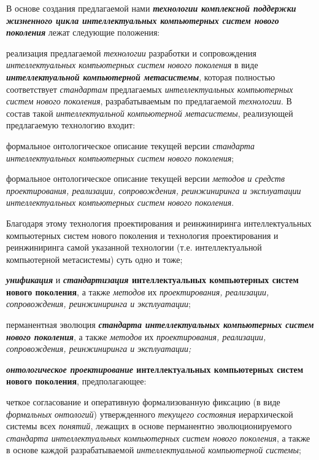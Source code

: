 В основе создания предлагаемой нами \textbf{\textit{технологии комплексной поддержки жизненного цикла интеллектуальных компьютерных систем нового поколения}} лежат следующие положения:
\begin{textitemize}
	\item реализация предлагаемой \textit{технологии} разработки и сопровождения \textit{интеллектуальных компьютерных систем нового поколения} в виде \textbf{\textit{интеллектуальной компьютерной метасистемы}}, которая полностью соответствует \textit{стандартам} предлагаемых \textit{интеллектуальных компьютерных систем нового поколения}, разрабатываемым по предлагаемой \textit{технологии}. В состав такой \textit{интеллектуальной компьютерной метасистемы}, реализующей предлагаемую технологию входит:
	
	\begin{textitemize}
		\item  формальное онтологическое описание текущей версии \textit{стандарта интеллектуальных компьютерных систем нового поколения};
		\item  формальное онтологическое описание текущей версии \textit{методов и средств проектирования, реализации, сопровождения, реинжиниринга и эксплуатации интеллектуальных компьютерных систем нового поколения}.
	\end{textitemize}
	
	Благодаря этому технология проектирования и реинжиниринга интеллектуальных компьютерных систем нового поколения и технология проектирования и реинжиниринга самой указанной технологии (т.е. интеллектуальной компьютерной метасистемы) суть одно и тоже;
	
	\item \textbf{\textit{унификация}} и \textbf{\textit{стандартизация} интеллектуальных компьютерных систем нового поколения}, а также \textit{методов} их \textit{проектирования, реализации, сопровождения, реинжиниринга и эксплуатации};
	\item перманентная эволюция \textbf{\textit{стандарта интеллектуальных компьютерных систем нового поколения}}, а также \textit{методов} их \textit{проектирования, реализации, сопровождения, реинжиниринга и эксплуатации;}
	\item \textbf{\textit{онтологическое проектирование} интеллектуальных компьютерных систем нового поколения}, предполагающее:
	
	\begin{textitemize}
		\item  четкое согласование и оперативную формализованную фиксацию (в виде \textit{формальных онтологий}) утвержденного \textit{текущего состояния} иерархической системы всех \textit{понятий}, лежащих в основе перманентно эволюционируемого \textit{стандарта интеллектуальных компьютерных систем нового поколения}, а также в основе каждой разрабатываемой \textit{интеллектуальной компьютерной системы};
		

\end{textitemize}
\end{textitemize}
